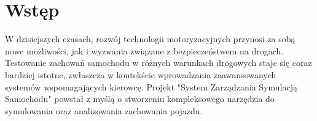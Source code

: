 ﻿\chapter*{Wstęp}

W dzisiejszych czasach, rozwój technologii motoryzacyjnych przynosi za sobą  nowe możliwości, jak i wyzwania związane z bezpieczeństwem na drogach. Testowanie zachowań samochodu w różnych warunkach drogowych staje się coraz bardziej istotne, zwłaszcza w kontekście wprowadzania zaawansowanych systemów wspomagających kierowcę. Projekt "System Zarządzania Symulacją Samochodu" powstał z myślą o stworzeniu kompleksowego narzędzia do symulowania oraz analizowania zachowania pojazdu.



